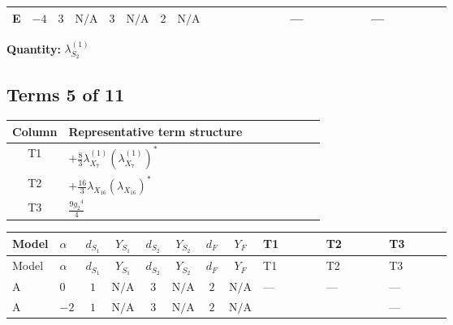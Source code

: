 \documentclass[8pt]{article}
\begin{document}
\begin{landscape}
\begin{longtable}{@{}llcccccc >{\raggedright\arraybackslash}p{0.21\linewidth} >{\raggedright\arraybackslash}p{0.21\linewidth} >{\raggedright\arraybackslash}p{0.21\linewidth}@{}}
\midrule
E & $-4$ & $3$ & $\text{N/A}$ & $3$ & $\text{N/A}$ & $2$ & $\text{N/A}$ & \scriptsize\adjustbox{max width=\linewidth}{$\begin{gathered} +16 {\lambda_{S_2}^{(A)}}^2\end{gathered}$} & --- & --- \\
\midrule
\bottomrule
\end{longtable}
\clearpage
\noindent\textbf{Quantity: }$\lambda_{S_2}^{(1)}$\par\smallskip
\subsection*{Terms 5 of 11}
\begin{center}
\begin{tabular}{@{}c >{\raggedright\arraybackslash}p{0.82\linewidth}@{}}
\toprule
Column & Representative term structure \\
\midrule
T1 & \(\displaystyle +\frac{8}{3} {\lambda_{X_{7}}^{(1)}} \left({\lambda_{X_{7}}^{(1)}}\right)^{*}\) \\
\midrule
T2 & \(\displaystyle +\frac{16}{3} {\lambda_{X_{16}}} \left({\lambda_{X_{16}}}\right)^{*}\) \\
\midrule
T3 & \(\displaystyle \frac{9 {g_2}^4}{4}\) \\
\midrule
\bottomrule
\end{tabular}
\end{center}
\smallskip
\tiny
\begin{longtable}{@{}llcccccc >{\raggedright\arraybackslash}p{0.21\linewidth} >{\raggedright\arraybackslash}p{0.21\linewidth} >{\raggedright\arraybackslash}p{0.21\linewidth}@{}}
\toprule
Model & $\alpha$ & $d_{S_1}$ & $Y_{S_1}$ & $d_{S_2}$ & $Y_{S_2}$ & $d_F$ & $Y_F$ & T1 & T2 & T3 \\
\midrule
\endfirsthead
\toprule
Model & $\alpha$ & $d_{S_1}$ & $Y_{S_1}$ & $d_{S_2}$ & $Y_{S_2}$ & $d_F$ & $Y_F$ & T1 & T2 & T3 \\
\midrule
\endhead
A & $0$ & $1$ & $\text{N/A}$ & $3$ & $\text{N/A}$ & $2$ & $\text{N/A}$ & --- & --- & --- \\
\midrule
A & $-2$ & $1$ & $\text{N/A}$ & $3$ & $\text{N/A}$ & $2$ & $\text{N/A}$ & \scriptsize\adjustbox{max width=\linewidth}{$\begin{gathered} +\frac{8}{3} {\lambda_{X_{7}}^{(1)}} \left({\lambda_{X_{7}}^{(1)}}\right)^{*}\end{gathered}$} & \scriptsize\adjustbox{max width=\linewidth}{$\begin{gathered} +\frac{16}{3} {\lambda_{X_{16}}} \left({\lambda_{X_{16}}}\right)^{*}\end{gathered}$} & --- \\

\end{longtable}
\end{landscape}
\end{document}
